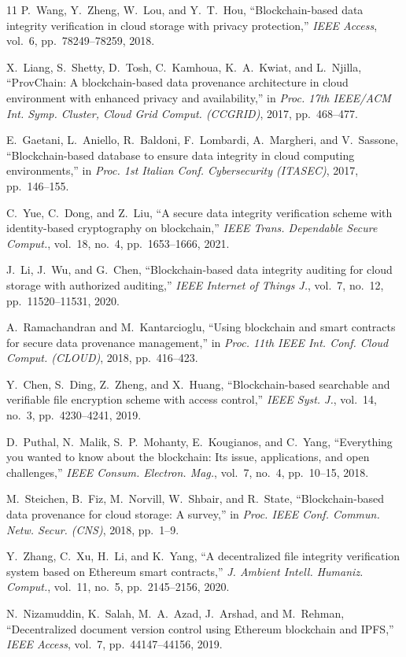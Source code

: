 \documentclass[10pt,conference,letterpaper]{IEEEtran}
\begin{document}
\begin{thebibliography}{11}
P.~Wang, Y.~Zheng, W.~Lou, and Y.~T.~Hou, ``Blockchain-based data integrity verification in cloud storage with privacy protection,'' \emph{IEEE Access}, vol.~6, pp.~78249--78259, 2018.

X.~Liang, S.~Shetty, D.~Tosh, C.~Kamhoua, K.~A.~Kwiat, and L.~Njilla, ``ProvChain: A blockchain-based data provenance architecture in cloud environment with enhanced privacy and availability,'' in \emph{Proc. 17th IEEE/ACM Int. Symp. Cluster, Cloud Grid Comput. (CCGRID)}, 2017, pp.~468--477.

E.~Gaetani, L.~Aniello, R.~Baldoni, F.~Lombardi, A.~Margheri, and V.~Sassone, ``Blockchain-based database to ensure data integrity in cloud computing environments,'' in \emph{Proc. 1st Italian Conf. Cybersecurity (ITASEC)}, 2017, pp.~146--155.

C.~Yue, C.~Dong, and Z.~Liu, ``A secure data integrity verification scheme with identity-based cryptography on blockchain,'' \emph{IEEE Trans. Dependable Secure Comput.}, vol.~18, no.~4, pp.~1653--1666, 2021.

J.~Li, J.~Wu, and G.~Chen, ``Blockchain-based data integrity auditing for cloud storage with authorized auditing,'' \emph{IEEE Internet of Things J.}, vol.~7, no.~12, pp.~11520--11531, 2020.

A.~Ramachandran and M.~Kantarcioglu, ``Using blockchain and smart contracts for secure data provenance management,'' in \emph{Proc. 11th IEEE Int. Conf. Cloud Comput. (CLOUD)}, 2018, pp.~416--423.

Y.~Chen, S.~Ding, Z.~Zheng, and X.~Huang, ``Blockchain-based searchable and verifiable file encryption scheme with access control,'' \emph{IEEE Syst. J.}, vol.~14, no.~3, pp.~4230--4241, 2019.

D.~Puthal, N.~Malik, S.~P.~Mohanty, E.~Kougianos, and C.~Yang, ``Everything you wanted to know about the blockchain: Its issue, applications, and open challenges,'' \emph{IEEE Consum. Electron. Mag.}, vol.~7, no.~4, pp.~10--15, 2018.

M.~Steichen, B.~Fiz, M.~Norvill, W.~Shbair, and R.~State, ``Blockchain-based data provenance for cloud storage: A survey,'' in \emph{Proc. IEEE Conf. Commun. Netw. Secur. (CNS)}, 2018, pp.~1--9.

Y.~Zhang, C.~Xu, H.~Li, and K.~Yang, ``A decentralized file integrity verification system based on Ethereum smart contracts,'' \emph{J. Ambient Intell. Humaniz. Comput.}, vol.~11, no.~5, pp.~2145--2156, 2020.

N.~Nizamuddin, K.~Salah, M.~A.~Azad, J.~Arshad, and M.~Rehman, ``Decentralized document version control using Ethereum blockchain and IPFS,'' \emph{IEEE Access}, vol.~7, pp.~44147--44156, 2019.
\end{thebibliography}
\end{document}
